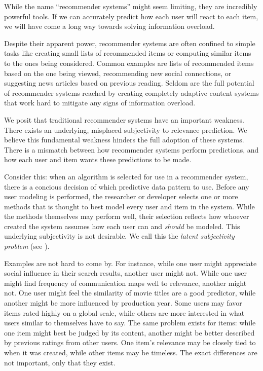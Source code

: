 While the name ``recommender systems'' might seem limiting, they are incredibly powerful tools.
If we can accurately predict how each user will react to each item,
we will have come a long way towards solving information overload.

Despite their apparent power, recommender systems are often confined
to simple tasks like creating small lists of recommended items
or computing similar items to the ones being considered.
Common examples are lists of recommended items based on the one being viewed, 
recommending new social connections, or suggesting news articles based on previous reading.
Seldom are the full potential of recommender systems reached by creating completely adaptive
content systems that work hard to mitigate any signs of information overload.

We posit that traditional recommender systems have an important weakness.
There exists an underlying, misplaced subjectivity to relevance prediction.
We believe this fundamental weakness hinders the full adoption of these systems.
There is a mismatch between how recommender systems perform predictions,
and how each user and item wants these predictions to be made.

Consider this: 
when an algorithm is selected for use in a recommender system,
there is a concious decision of which predictive data pattern to use.
Before any user modeling is performed, the researcher or developer selects
one or more methods that is thought to best model every user and item in the system.
While the methods themselves may perform well, their selection
reflects how whoever created the system assumes how each user
can and \emph{should} be modeled. This underlying subjectivity is not desirable.
We call this the \emph{latent subjectivity problem}
(see \cite[p.33]{Bjorkoy2011}).

Examples are not hard to come by.
For instance, while one user might appreciate social
influence in their search results, another user might not.
While one user might find frequency of communication maps well to relevance,
another might not. 
One user might feel the similarity of movie titles are a good predictor,
while another might be more influenced by production year.
Some users may favor items rated highly on a global scale,
while others are more interested in what users similar to themselves have to say.
The same problem exists for items: while one item might best be judged by its content,
another might be better described by previous ratings from other users.
One item's relevance may be closely tied to when it was created,
while other items may be timeless.
The exact differences are not important, only that they exist.

